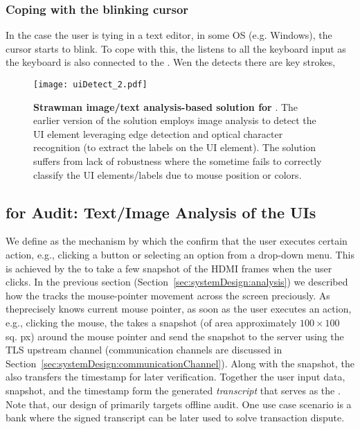 \subsubsection{Coping with the blinking cursor} In the case the user is tying in a text editor, in some OS (e.g. Windows), the cursor starts to blink. To cope with this, the \device listens to all the keyboard input as the keyboard is also connected to the \device. Wen the \device detects there are key strokes,

\begin{figure}[t]
\centering
\texttt{[image: uiDetect\_2.pdf]}
\caption{\textbf{Strawman image/text analysis-based solution for \poa}. The earlier version of the \name solution employs image analysis to detect the UI element leveraging edge detection and optical character recognition (to extract the labels on the UI element). The solution suffers from lack of robustness where the \device sometime fails to correctly classify the UI elements/labels due to mouse position or colors.}
\label{fig:uiDetect}
\centering
\end{figure}



\subsection{\Poa for Audit: Text/Image Analysis of the UIs}
\label{sec:systemDesign:poa}


We define \emph{\poa} as the mechanism by which the \device confirm that the user executes certain action, e.g., clicking a button  or selecting an option from a drop-down menu. This is achieved by the \device to take a few snapshot of the HDMI frames when the user clicks. In the previous section (Section~\ref{sec:systemDesign:analysis}) we described how the \device tracks the mouse-pointer movement across the screen preciously. As the\device precisely knows current mouse pointer, as soon as the user executes an action, e.g., clicking the mouse, the \device takes a snapshot (of area approximately $100 \times 100$ sq. px) around the mouse pointer and send the snapshot to the server using the TLS upstream channel (communication channels are discussed in Section~\ref{sec:systemDesign:communicationChannel}). Along with the snapshot, the \device also transfers the timestamp for later verification. Together the user input data, snapshot, and the timestamp form the \device generated \emph{transcript} that serves as the \poa. Note that, our design of \poa primarily targets offline audit. One use case scenario is a bank where the signed transcript can be later used to solve transaction dispute. 

